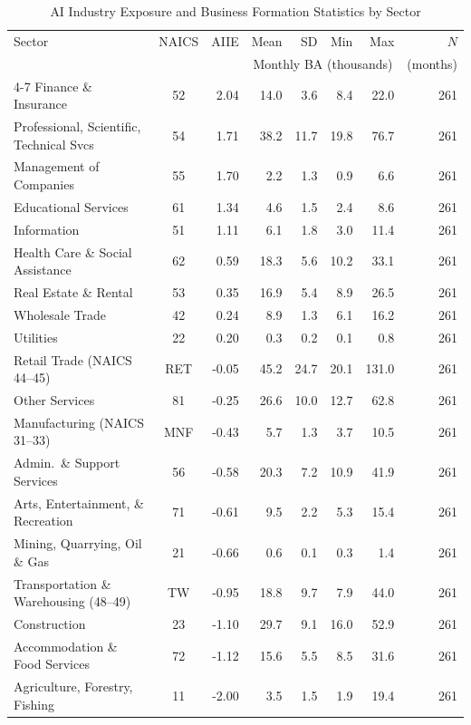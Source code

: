 \begin{table}[H]
\centering
\small
\caption{AI Industry Exposure and Business Formation Statistics by Sector}
\label{tab:summary}
\begin{threeparttable}
\begin{tabular}{lcrrrrrr}
\toprule
  Sector & NAICS & AIIE & Mean & SD & Min & Max & $N$ \\
  & &  & \multicolumn{4}{c}{Monthly BA (thousands)} & (months) \\
\cmidrule(lr){4-7}
\midrule
  Finance \& Insurance & 52 & 2.04 & 14.0 & 3.6 & 8.4 & 22.0 & 261 \\
  Professional, Scientific, Technical Svcs & 54 & 1.71 & 38.2 & 11.7 & 19.8 & 76.7 & 261 \\
  Management of Companies & 55 & 1.70 & 2.2 & 1.3 & 0.9 & 6.6 & 261 \\
  Educational Services & 61 & 1.34 & 4.6 & 1.5 & 2.4 & 8.6 & 261 \\
  Information & 51 & 1.11 & 6.1 & 1.8 & 3.0 & 11.4 & 261 \\
  Health Care \& Social Assistance & 62 & 0.59 & 18.3 & 5.6 & 10.2 & 33.1 & 261 \\
  Real Estate \& Rental & 53 & 0.35 & 16.9 & 5.4 & 8.9 & 26.5 & 261 \\
  Wholesale Trade & 42 & 0.24 & 8.9 & 1.3 & 6.1 & 16.2 & 261 \\
  Utilities & 22 & 0.20 & 0.3 & 0.2 & 0.1 & 0.8 & 261 \\
  Retail Trade (NAICS 44--45) & RET & -0.05 & 45.2 & 24.7 & 20.1 & 131.0 & 261 \\
  Other Services & 81 & -0.25 & 26.6 & 10.0 & 12.7 & 62.8 & 261 \\
  Manufacturing (NAICS 31--33) & MNF & -0.43 & 5.7 & 1.3 & 3.7 & 10.5 & 261 \\
  Admin.~\& Support Services & 56 & -0.58 & 20.3 & 7.2 & 10.9 & 41.9 & 261 \\
  Arts, Entertainment, \& Recreation & 71 & -0.61 & 9.5 & 2.2 & 5.3 & 15.4 & 261 \\
  Mining, Quarrying, Oil \& Gas & 21 & -0.66 & 0.6 & 0.1 & 0.3 & 1.4 & 261 \\
  Transportation \& Warehousing (48--49) & TW & -0.95 & 18.8 & 9.7 & 7.9 & 44.0 & 261 \\
  Construction & 23 & -1.10 & 29.7 & 9.1 & 16.0 & 52.9 & 261 \\
  Accommodation \& Food Services & 72 & -1.12 & 15.6 & 5.5 & 8.5 & 31.6 & 261 \\
  Agriculture, Forestry, Fishing & 11 & -2.00 & 3.5 & 1.5 & 1.9 & 19.4 & 261 \\

\end{tabular}
\end{threeparttable}
\end{table}
